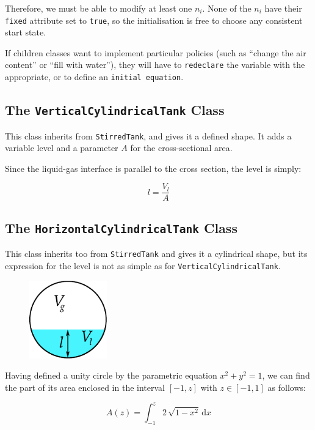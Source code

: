 \documentclass[a4paper]{article}
\renewcommand{\d}{\ensuremath{\mathrm{d}}}
\begin{document}
Therefore, we must be able to modify at least one $n_i$. None of the $n_i$ have
their \texttt{fixed} attribute set to \texttt{true}, so the initialisation is
free to choose any consistent start state.

If children classes want to implement particular policies (such as ``change the
air content'' or ``fill with water''), they will have to \texttt{redeclare} the
variable with the appropriate, or to define an \texttt{initial equation}.

\subsection{The \texttt{VerticalCylindricalTank} Class}
This class inherits from \texttt{StirredTank}, and gives it a defined shape.
It adds a variable level and a parameter $A$ for the cross-sectional area.

Since the liquid-gas interface is parallel to the cross section, the level is
simply:

\begin{equation}
l = \frac{V_l}{A}
\end{equation}

\subsection{The \texttt{HorizontalCylindricalTank} Class}
This class inherits too from \texttt{StirredTank} and gives it a cylindrical
shape, but its expression for the level is not as simple as for
\texttt{VerticalCylindricalTank}.

\begin{figure}[h]
\centering
\includegraphics[width=0.3\textwidth]{pics/crosssection}
\end{figure}

Having defined a unity circle by the parametric equation $x^2+y^2=1$, we can
find the part of its area enclosed in the interval $[-1,z]$ with $z \in [-1,1]$
as follows:

\begin{equation}
A(z) = \int_{-1}^z 2 \, \sqrt{1-x^2} \, \d x
\end{equation}
\end{document}
